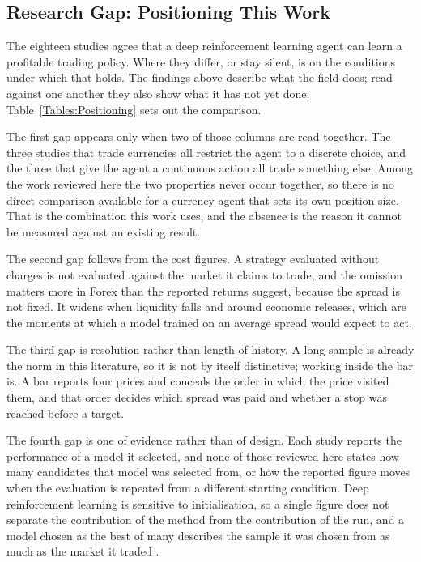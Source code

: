 \subsection{Research Gap: Positioning This Work}

The eighteen studies agree that a deep reinforcement learning agent can learn a profitable trading policy. Where they differ, or stay silent, is on the conditions under which that holds. The findings above describe what the field does; read against one another they also show what it has not yet done. Table~\ref{Tables:Positioning} sets out the comparison.



The first gap appears only when two of those columns are read together. The three studies that trade currencies \cite{carapuco_reinforcement_2018, huang_financial_2018, rundo_deep_2019} all restrict the agent to a discrete choice, and the three that give the agent a continuous action \cite{majidi_algorithmic_2022, jia_lstm-ddpg_2021, zhang_deep_2020} all trade something else. Among the work reviewed here the two properties never occur together, so there is no direct comparison available for a currency agent that sets its own position size. That is the combination this work uses, and the absence is the reason it cannot be measured against an existing result.

The second gap follows from the cost figures. A strategy evaluated without charges is not evaluated against the market it claims to trade, and the omission matters more in Forex than the reported returns suggest, because the spread is not fixed. It widens when liquidity falls and around economic releases, which are the moments at which a model trained on an average spread would expect to act.

The third gap is resolution rather than length of history. A long sample is already the norm in this literature, so it is not by itself distinctive; working inside the bar is. A bar reports four prices and conceals the order in which the price visited them, and that order decides which spread was paid and whether a stop was reached before a target.

The fourth gap is one of evidence rather than of design. Each study reports the performance of a model it selected, and none of those reviewed here states how many candidates that model was selected from, or how the reported figure moves when the evaluation is repeated from a different starting condition. Deep reinforcement learning is sensitive to initialisation, so a single figure does not separate the contribution of the method from the contribution of the run, and a model chosen as the best of many describes the sample it was chosen from as much as the market it traded \cite{bailey_pseudo-mathematics_2014, lopez_de_prado_advances_2018}.

